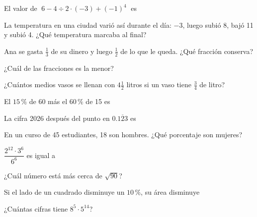 \bitacora

\evaluacion
\begin{ejercicios}
\item El valor de $\;6 - 4 \div 2 \cdot (-3) + (-1)^{4}\;$ es
\item La temperatura en una ciudad varió así durante el día: $-3$, luego subió 8, bajó 11 y subió 4. ¿Qué temperatura marcaba al final?
\item Ana se gasta $\tfrac13$ de su dinero y luego $\tfrac12$ de lo que le queda. ¿Qué fracción conserva?
\item ¿Cuál de las fracciones es la menor?
\item ¿Cuántos medios vasos se llenan con $4\tfrac12$ litros si un vaso tiene $\tfrac34$ de litro?
\item El $15\,\%$ de 60 más el $60\,\%$ de 15 es
\item La cifra 2026 después del punto en $0.\overline{123}$ es
\item En un curso de 45 estudiantes, 18 son hombres. ¿Qué porcentaje son mujeres?
\item $\dfrac{2^{12} \cdot 3^{6}}{6^{6}}$ es igual a
\item ¿Cuál número está más cerca de $\sqrt{90}$?
\item Si el lado de un cuadrado disminuye un $10\,\%$, su área disminuye
\item ¿Cuántas cifras tiene $8^{5} \cdot 5^{14}$?
\end{ejercicios}
